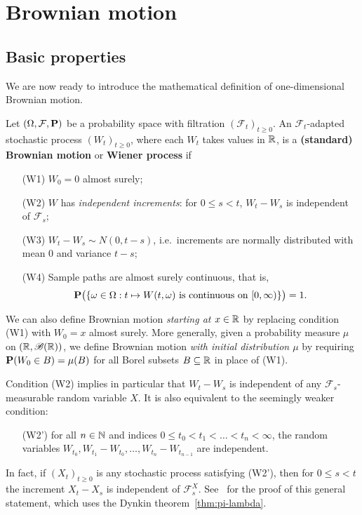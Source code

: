 \section{Brownian motion}

\subsection{Basic properties}
We are now ready to introduce the mathematical definition of one-dimensional Brownian motion.
\begin{definition}
Let $(\Omega,\mathcal{F},\mathbf{P})$ be a probability space with filtration $(\mathcal{F}_t)_{t \ge 0}$. An $\mathcal{F}_t$-adapted stochastic process $(W_t)_{t\ge 0}$, where each $W_t$ takes values in $\mathbb{R}$, is a \textbf{(standard) Brownian motion} or \textbf{Wiener process} if
\begin{itemize}
    \item[(W1)] $W_0 = 0$ almost surely;
    \item[(W2)] $W$ has \emph{independent increments}: for $0\le s < t$, $W_t - W_s$ is independent of $\mathcal{F}_s$;
    \item[(W3)] $W_t - W_s \sim N(0, t-s)$, i.e.\ increments are normally distributed with mean 0 and variance $t-s$;
    \item[(W4)] Sample paths are almost surely continuous, that is,
    \begin{equation*}
        \mathbf{P}\big(\{ \omega\in\Omega : t \mapsto W(t,\omega) \text{ is continuous on } [0,\infty) \}\big) = 1.
    \end{equation*}
\end{itemize}
We can also define Brownian motion \emph{starting at $x\in\mathbb{R}$} by replacing condition (W1) with $W_0 = x$ almost surely. More generally, given a probability measure $\mu$ on $(\mathbb{R},\mathscr{B}(\mathbb{R}))$, we define Brownian motion \emph{with initial distribution $\mu$} by requiring $\mathbf{P}(W_0\in B) = \mu(B)$ for all Borel subsets $B\subseteq\mathbb{R}$ in place of (W1).
\end{definition}

\begin{remark}
\label{rmk:indep-increments}
Condition (W2) implies in particular that $W_t-W_s$ is independent of any $\mathcal{F}_s$-measurable random variable $X$. It is also equivalent to the seemingly weaker condition:
\begin{itemize}
    \item[(W2')] for all $n\in\mathbb{N}$ and indices $0\le t_0<t_1<\ldots<t_n<\infty$, the random variables $W_{t_0}, W_{t_1}-W_{t_0}, \ldots, W_{t_n}-W_{t_{n-1}}$ are independent.
\end{itemize}
In fact, if $(X_t)_{t\ge 0}$ is any stochastic process satisfying (W2'), then for $0\le s<t$ the increment $X_t-X_s$ is independent of $\mathcal{F}_s^X$. See~\cite[Chapter 2, Problem 1.4]{KS} for the proof of this general statement, which uses the Dynkin theorem~\eqref{thm:pi-lambda}.
\end{remark}

